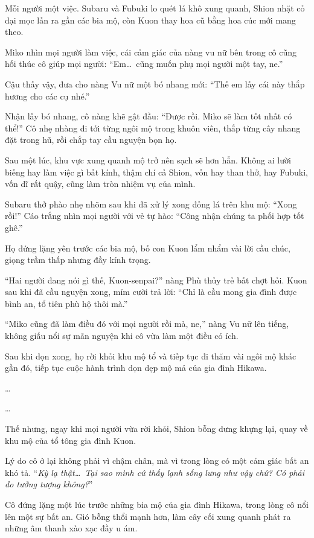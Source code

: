 \documentclass[../main.tex]{subfiles}
\begin{document}
Mỗi người một việc. Subaru và Fubuki lo quét lá khô xung quanh, Shion nhặt cỏ dại mọc lấn ra gần các bia mộ, còn Kuon thay hoa cũ bằng hoa cúc mới mang theo.

Miko nhìn mọi người làm việc, cái cảm giác của nàng vu nữ bên trong cô cũng hối thúc cô giúp mọi người: ``Em\dots\ cũng muốn phụ mọi người một tay, ne.''

Cậu thấy vậy, đưa cho nàng Vu nữ một bó nhang mới: ``Thế em lấy cái này thắp hương cho các cụ nhé.''

Nhận lấy bó nhang, cô nàng khẽ gật đầu: ``Được rồi. Miko sẽ làm tốt nhất có thể!'' Cô nhẹ nhàng đi tới từng ngôi mộ trong khuôn viên, thắp từng cây nhang đặt trong hũ, rồi chắp tay cầu nguyện bọn họ.

Sau một lúc, khu vực xung quanh mộ trở nên sạch sẽ hơn hẳn. Không ai lười biếng hay làm việc gì bất kính, thậm chí cả Shion, vốn hay than thở, hay Fubuki, vốn dĩ rất quậy, cũng làm tròn nhiệm vụ của mình.

Subaru thở phào nhẹ nhõm sau khi đã xử lý xong đống lá trên khu mộ: ``Xong rồi!'' Cáo trắng nhìn mọi người với vẻ tự hào: ``Công nhận chúng ta phối hợp tốt ghê.''

Họ đứng lặng yên trước các bia mộ, bố con Kuon lẩm nhẩm vài lời cầu chúc, giọng trầm thấp nhưng đầy kính trọng.

``Hai người đang nói gì thế, Kuon-senpai?'' nàng Phù thủy trẻ bất chợt hỏi. Kuon sau khi đã cầu nguyện xong, mỉm cười trả lời: ``Chỉ là cầu mong gia đình được bình an, tổ tiên phù hộ thôi mà.''

``Miko cũng đã làm điều đó với mọi người rồi mà, ne,'' nàng Vu nữ lên tiếng, không giấu nổi sự mãn nguyện khi cô vừa làm một điều có ích.

Sau khi dọn xong, họ rời khỏi khu mộ tổ và tiếp tục đi thăm vài ngôi mộ khác gần đó, tiếp tục cuộc hành trình dọn dẹp mộ mả của gia đình Hikawa.

\dots

\dots

Thế nhưng, ngay khi mọi người vừa rời khỏi, Shion bỗng dưng khựng lại, quay về khu mộ của tổ tông gia đình Kuon.

Lý do cô ở lại không phải vì chậm chân, mà vì trong lòng có một cảm giác bất an khó tả. ``\textit{Kỳ lạ thật\dots\ Tại sao mình cứ thấy lạnh sống lưng như vậy chứ? Có phải do tưởng tượng không?}''

Cô đứng lặng một lúc trước những bia mộ của gia đình Hikawa, trong lòng cô nổi lên một sự bất an. Gió bỗng thổi mạnh hơn, làm cây cối xung quanh phát ra những âm thanh xào xạc đầy u ám.
\end{document}
